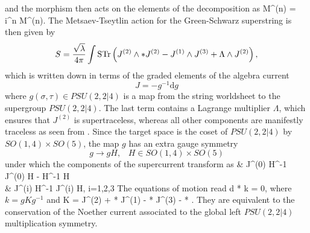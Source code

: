\eeqa 
and the morphism then acts on the elements of the decomposition as
\beq
	\Omega \circ M^{(n)} = i^n M^{(n)}.
\eeq
The Metsaev-Tseytlin action for the Green-Schwarz superstring is then given by
\begin{equation}
	\label{eq:mt_action}
	S = \frac{\sqrt{\lambda}}{4 \pi} \int \operatorname{STr} \left( J^{(2)} \wedge * J^{(2)} - J^{(1)} \wedge J^{(3)} + \Lambda \wedge J^{(2)} \right),
\end{equation}
which is written down in terms of the graded elements of the algebra current
\begin{equation}
	J = -g^{-1} \mathrm{d} g %
	\label{eq:j_current}
\end{equation}
where $g(\sigma, \tau) \in PSU(2,2|4)$ is a map from the string worldsheet to the supergroup $PSU(2,2|4)$. 
The last term contains a Lagrange multiplier $\Lambda$, which ensures that $J^{(2)}$ is supertraceless, whereas all other components are manifestly traceless as seen from . 
Since the target space is the coset of $PSU(2,2|4)$ by $SO(1,4) \times SO(5)$, the map $g$ has an extra gauge symmetry
\begin{equation}
	g \rightarrow gH, \,\,\,\,\, H \in SO(1,4) \times SO(5)
\end{equation}
under which the components of the supercurrent transform as
\beqa
	& J^{(0)} \rightarrow H^{-1} J^{(0)} H - H^{-1}  H \\
	& J^{(i)} \rightarrow H^{-1} J^{(i)} H, \quad i=1,2,3
\eeqa
The equations of motion read
\beq
	d * k = 0,
\eeq
where $k = gKg^{-1}$ and
\beq
	K = J^{(2)} +  J^{(1)} -  J^{(3)} -  \Lambda.
\eeq
They are equivalent to the conservation of the Noether current associated to the global left $PSU(2,2|4)$ multiplication symmetry.

